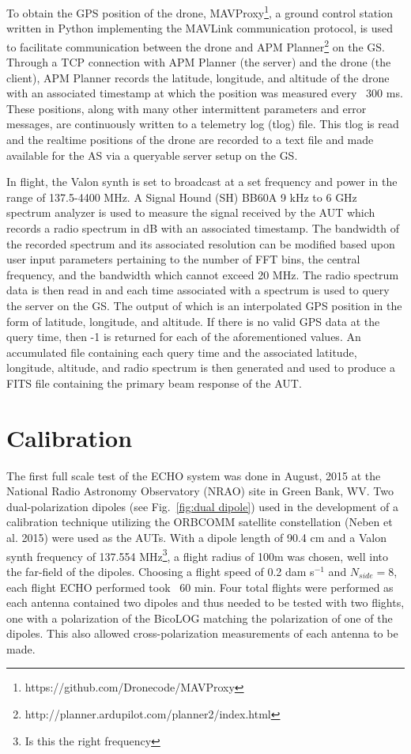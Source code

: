 \documentclass[preprint2]{aastex}
\begin{document}
To obtain the GPS position of the drone, MAVProxy\footnote{https://github.com/Dronecode/MAVProxy}, a ground control station written in Python implementing the MAVLink communication protocol, is used to facilitate communication between the drone and APM Planner\footnote{http://planner.ardupilot.com/planner2/index.html} on the GS. Through a TCP connection with APM Planner (the server) and the drone (the client), APM Planner records the latitude, longitude, and altitude of the drone with an associated timestamp at which the position was measured every ~300 ms.  These positions, along with many other intermittent parameters and error messages, are continuously written to a telemetry log (tlog) file.  This tlog is read and the realtime positions of the drone are recorded to a text file and made available for the AS via a queryable server setup on the GS.

In flight, the Valon synth is set to broadcast at a set frequency and power in the range of 137.5-4400 MHz.  A Signal Hound (SH) BB60A 9 kHz to 6 GHz spectrum analyzer is used to measure the signal received by the AUT which records a radio spectrum in dB with an associated timestamp.  The bandwidth of the recorded spectrum and its associated resolution can be modified based upon user input parameters pertaining to the number of FFT bins, the central frequency, and the bandwidth which cannot exceed 20 MHz.  The radio spectrum data is then read in and each time associated with a spectrum is used to query the server on the GS.  The output of which is an interpolated GPS position in the form of latitude, longitude, and altitude.  If there is no valid GPS data at the query time, then -1 is returned for each of the aforementioned values.  An accumulated file containing each query time and the associated latitude, longitude, altitude, and radio spectrum is then generated and used to produce a FITS file containing the primary beam response of the AUT.


\section{Calibration}

The first full scale test of the ECHO system was done in August, 2015 at the National Radio Astronomy Observatory (NRAO) site in Green Bank, WV.  Two dual-polarization dipoles (see Fig.~\ref{fig:dual dipole}) used in the development of a calibration technique utilizing the ORBCOMM satellite constellation (Neben et al. 2015) were used as the AUTs.  With a dipole length of 90.4 cm and a Valon synth frequency of 137.554 MHz\footnote{Is this the right frequency}, a flight radius of 100m was chosen, well into the far-field of the dipoles.  Choosing a flight speed of 0.2 dam s$^{-1}$ and $N_{side}=8$, each flight ECHO performed took ~60 min.  Four total flights were performed as each antenna contained two dipoles and thus needed to be tested with two flights, one with a polarization of the BicoLOG matching the polarization of one of the dipoles.  This also allowed cross-polarization measurements of each antenna to be made.
\end{document}
